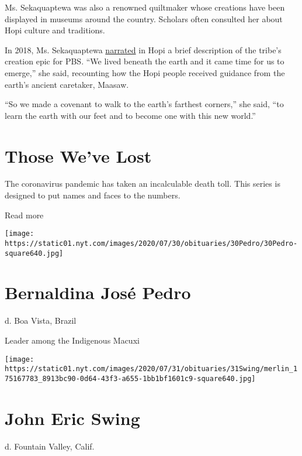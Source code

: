 Ms. Sekaquaptewa was also a renowned quiltmaker whose creations have
been displayed in museums around the country. Scholars often consulted
her about Hopi culture and traditions.

In 2018, Ms. Sekaquaptewa
\href{https://www.pbs.org/video/hopi-origin-story-dc0awe/}{narrated} in
Hopi a brief description of the tribe's creation epic for PBS. ``We
lived beneath the earth and it came time for us to emerge,'' she said,
recounting how the Hopi people received guidance from the earth's
ancient caretaker, Maasaw.

``So we made a covenant to walk to the earth's farthest corners,'' she
said, ``to learn the earth with our feet and to become one with this new
world.''

\href{https://www.nytimes.com/interactive/2020/obituaries/people-died-coronavirus-obituaries.html?action=click\&pgtype=Article\&state=default\&region=BELOW_MAIN_CONTENT\&context=covid_obits_promo}{}

\hypertarget{those-weve-lost}{%
\section{Those We've Lost}\label{those-weve-lost}}

The coronavirus pandemic has taken an incalculable death toll. This
series is designed to put names and faces to the numbers.

Read more

\texttt{[image: https://static01.nyt.com/images/2020/07/30/obituaries/30Pedro/30Pedro-square640.jpg]}

\hypertarget{bernaldina-josuxe9-pedro}{%
\section{Bernaldina José Pedro}\label{bernaldina-josuxe9-pedro}}

d. Boa Vista, Brazil

Leader among the Indigenous Macuxi

\texttt{[image: https://static01.nyt.com/images/2020/07/31/obituaries/31Swing/merlin\_175167783\_8913bc90-0d64-43f3-a655-1bb1bf1601c9-square640.jpg]}

\hypertarget{john-eric-swing}{%
\section{John Eric Swing}\label{john-eric-swing}}

d. Fountain Valley, Calif.

